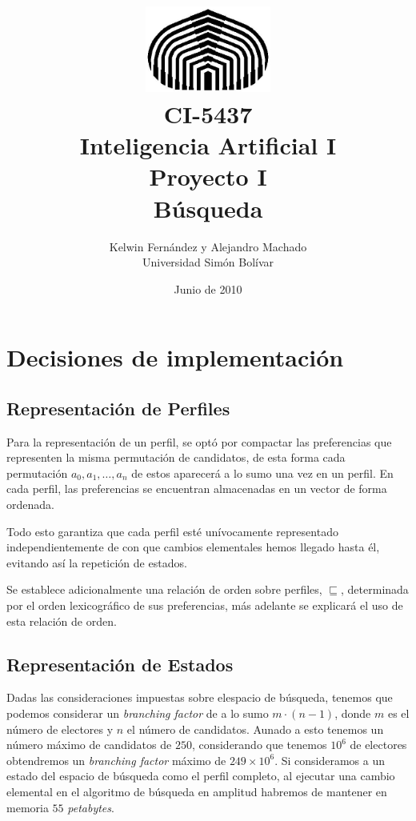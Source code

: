 \documentclass[letterpaper,12pt, titlepage]{article}
\begin{document}
\title{	\includegraphics[height=80pt]{usb.jpg} \\
CI-5437 \\ Inteligencia Artificial I \\
Proyecto I\\
Búsqueda}
\author{Kelwin Fernández y Alejandro Machado\\
	Universidad Simón Bolívar} 
\date{Junio de 2010} 
\maketitle

\section{Decisiones de implementación}

\subsection{Representación de Perfiles}

Para la representación de un perfil, se optó por
compactar las preferencias que representen
la misma permutación de candidatos, de esta forma cada permutación
$a_0, a_1, \ldots, a_n$ de estos aparecerá a lo sumo una vez
en un perfil. En cada perfil, las preferencias se encuentran
almacenadas en un vector de forma ordenada.

Todo esto garantiza que cada perfil esté unívocamente representado
independientemente de con que cambios elementales hemos llegado
hasta él, evitando así la repetición de estados.

\bigskip
Se establece adicionalmente una relación de orden sobre perfiles,
$\sqsubseteq$, determinada por el orden lexicográfico de sus
preferencias, más adelante se explicará el uso de esta relación
de orden.

\subsection{Representación de Estados}

Dadas las consideraciones impuestas sobre elespacio de búsqueda,
tenemos que podemos considerar un \textit{branching factor} de a
lo sumo $m\cdot(n-1)$, donde $m$ es el número de electores y $n$
el número de candidatos. Aunado a esto tenemos un número máximo
de candidatos de $250$, considerando que tenemos $10^6$ de electores
obtendremos un \textit{branching factor} máximo de $249\times 10^6$.
Si consideramos a un estado del espacio de búsqueda como el perfil
completo, al ejecutar una cambio elemental en el algoritmo de
búsqueda en amplitud habremos de mantener en memoria $55$
\textit{petabytes}.
\end{document}
